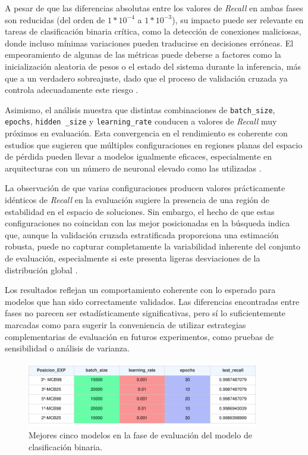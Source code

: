 A pesar de que las diferencias absolutas entre los valores de \textit{Recall} en ambas fases son reducidas (del orden de $1*10^{-4}$ a $1*10^{-3}$), su impacto puede ser relevante en tareas de clasificación binaria crítica, como la detección de conexiones maliciosas, donde incluso mínimas variaciones pueden traducirse en decisiones erróneas. El empeoramiento de algunas de las métricas puede deberse a factores como la inicialización aleatoria de pesos o el estado del sistema durante la inferencia, más que a un verdadero sobreajuste, dado que el proceso de validación cruzada ya controla adecuadamente este riesgo \cite{goodfellow2016deep}.

Asimismo, el análisis muestra que distintas combinaciones de \texttt{batch\_size}, \texttt{epochs}, \texttt{hidden \_size} y \texttt{learning\_rate} conducen a valores de \textit{Recall} muy próximos en evaluación. Esta convergencia en el rendimiento es coherente con estudios que sugieren que múltiples configuraciones en regiones planas del espacio de pérdida pueden llevar a modelos igualmente eficaces, especialmente en arquitecturas con un número de neuronal elevado como las utilizadas \cite{bouthillier2021sloppy}.

La observación de que varias configuraciones producen valores prácticamente idénticos de \textit{Recall} en la evaluación sugiere la presencia de una región de estabilidad en el espacio de soluciones. Sin embargo, el hecho de que estas configuraciones no coincidan con las mejor posicionadas en la búsqueda indica que, aunque la validación cruzada estratificada proporciona una estimación robusta, puede no capturar completamente la variabilidad inherente del conjunto de evaluación, especialmente si este presenta ligeras desviaciones de la distribución global \cite{recht2019imagenet}.

Los resultados reflejan un comportamiento coherente con lo esperado para modelos que han sido correctamente validados. Las diferencias encontradas entre fases no parecen ser estadísticamente significativas, pero sí lo suficientemente marcadas como para sugerir la conveniencia de utilizar estrategias complementarias de evaluación en futuros experimentos, como pruebas de sensibilidad o análisis de varianza.

\begin{figure}[H]
    \centering
    \includegraphics[width=0.9\textwidth]{./img/evaluacion/resultados/top5EVALMCB.pdf}
    \caption{Mejores cinco modelos en la fase de evaluación del modelo de clasificación binaria.}
    \label{fig:top5EVALMCB}
\end{figure}

